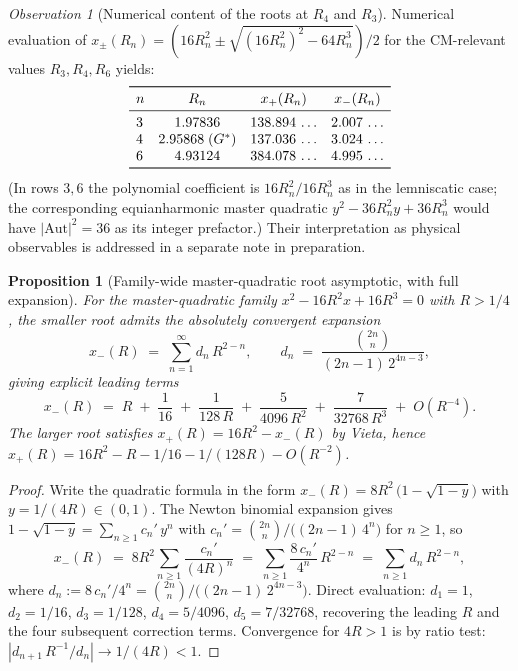 \documentclass[11pt]{article}
\newtheorem{proposition}[theorem]{Proposition}
\theoremstyle{definition}
\theoremstyle{remark}
\newtheorem*{observation}{Observation}
\newcommand{\Gs}{G^{*}}
\newcommand{\Aut}{\mathrm{Aut}}
\begin{document}
\begin{observation}[Numerical content of the roots at $R_4$ and $R_3$]\label{obs:Rn-numerical}
Numerical evaluation of $x_\pm(R_n) = (16 R_n^2 \pm \sqrt{(16 R_n^2)^2 - 64 R_n^3})/2$
for the CM-relevant values $R_3, R_4, R_6$ yields:
\[
\begin{array}{lccc}
\toprule
n & R_n & x_+(R_n) & x_-(R_n) \\
\midrule
3 & 1.97836 & 138.894\,\ldots & 2.007\,\ldots \\
4 & 2.95868\;(\Gs) & 137.036\,\ldots & 3.024\,\ldots \\
6 & 4.93124 & 384.078\,\ldots & 4.995\,\ldots \\
\bottomrule
\end{array}
\]
(In rows $3, 6$ the polynomial coefficient is $16 R_n^2 / 16 R_n^3$ as in the
lemniscatic case; the corresponding equianharmonic master quadratic
$y^2 - 36 R_n^2 y + 36 R_n^3$ would have $|\Aut|^{2} = 36$ as its integer
prefactor.) Their interpretation as physical observables is addressed in
a separate note in preparation.
\end{observation}

\begin{proposition}[Family-wide master-quadratic root asymptotic, with full expansion]\label{prop:Rn-asymptotic}
For the master-quadratic family
$x^2 - 16 R^2 x + 16 R^3 = 0$ with $R > 1/4$, the smaller root admits the
absolutely convergent expansion
\[
x_-(R) \;=\; \sum_{n=1}^\infty d_n\,R^{2-n}, \qquad
d_n \;=\; \frac{\binom{2n}{n}}{(2n-1)\,2^{4n-3}},
\]
giving explicit leading terms
\[
x_-(R) \;=\; R \;+\; \frac{1}{16} \;+\; \frac{1}{128\,R} \;+\; \frac{5}{4096\,R^2}
            \;+\; \frac{7}{32768\,R^3} \;+\; O(R^{-4}).
\]
The larger root satisfies $x_+(R) = 16 R^2 - x_-(R)$ by Vieta, hence
$x_+(R) = 16 R^2 - R - 1/16 - 1/(128R) - O(R^{-2})$.
\end{proposition}

\begin{proof}
Write the quadratic formula in the form
$x_-(R) = 8 R^2\,\bigl(1 - \sqrt{1 - y}\bigr)$ with $y = 1/(4R) \in (0, 1)$.
The Newton binomial expansion gives
$1 - \sqrt{1 - y} = \sum_{n \geq 1} c_n'\, y^n$
with $c_n' = \binom{2n}{n}/\bigl((2n-1)\,4^n\bigr)$ for $n \geq 1$, so
\[
x_-(R) \;=\; 8 R^2 \sum_{n \geq 1} \frac{c_n'}{(4R)^n}
       \;=\; \sum_{n \geq 1} \frac{8\,c_n'}{4^n}\,R^{2-n}
       \;=\; \sum_{n \geq 1} d_n\, R^{2-n},
\]
where $d_n := 8\,c_n'/4^n = \binom{2n}{n}/\bigl((2n-1)\,2^{4n-3}\bigr)$.
Direct evaluation: $d_1 = 1$, $d_2 = 1/16$, $d_3 = 1/128$, $d_4 = 5/4096$,
$d_5 = 7/32768$, recovering the leading $R$ and the four subsequent
correction terms. Convergence for $4R > 1$ is by ratio test:
$|d_{n+1}\,R^{-1}/d_n| \to 1/(4R) < 1$.
\end{proof}
\end{document}
